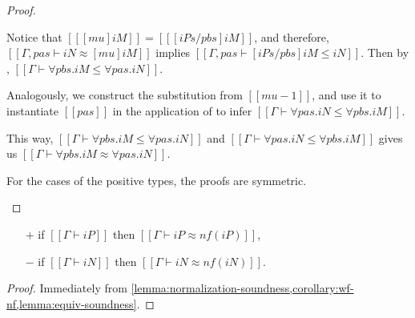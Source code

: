 \begin{proof}
\begin{caseof}
      Notice that $[[ [mu]iM ]] = [[ [iPs/pbs]iM ]]$, and therefore,
      $[[Γ, pas ⊢ iN ≈ [mu] iM]]$ implies $[[Γ, pas ⊢ [iPs/pbs]iM ≤ iN]]$. Then by
      , $[[Γ ⊢ ∀pbs.iM ≤ ∀pas.iN]]$.

      Analogously, we construct the substitution from $[[mu-1]]$, and use it to
      instantiate $[[pas]]$ in the application of
       to infer $[[Γ ⊢ ∀pas.iN ≤ ∀pbs.iM]]$.

      This way, $[[Γ ⊢ ∀pbs.iM ≤ ∀pas.iN]]$ and $[[Γ ⊢ ∀pas.iN ≤ ∀pbs.iM]]$
      gives us $[[Γ ⊢ ∀pbs.iM ≈ ∀pas.iN]]$.

    \item For the cases of the positive types, the proofs are symmetric.
  \end{caseof}
\end{proof}

\begin{corollary} 
  \label{corollary:nf-sound-wrt-subt-equiv}
  \hfill
  \begin{itemize}
    \item [$+$] if $[[Γ ⊢ iP]]$ then $[[Γ ⊢ iP ≈ nf(iP)]]$,
    \item [$-$] if $[[Γ ⊢ iN]]$ then $[[Γ ⊢ iN ≈ nf(iN)]]$.
  \end{itemize}
\end{corollary}
\begin{proof}
  Immediately from \cref{lemma:normalization-soundness,corollary:wf-nf,lemma:equiv-soundness}.
\end{proof}

